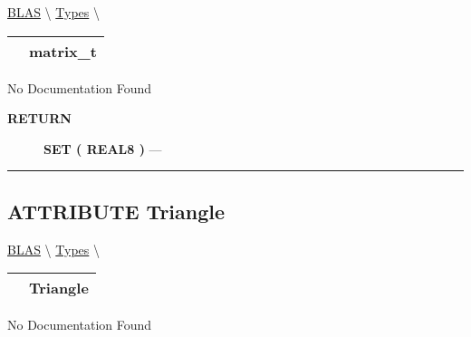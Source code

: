 \hypertarget{ecldoc:blas.types.matrix_t}{}
\hspace{0pt} \hyperlink{ecldoc:blas}{BLAS} \textbackslash 
\hspace{0pt} \hyperlink{ecldoc:BLAS.Types}{Types} \textbackslash 

{\renewcommand{\arraystretch}{1.5}
\begin{tabularx}{\textwidth}{|>{\raggedright\arraybackslash}l|X|}
\hline
\hspace{0pt}\mytexttt{\color{red} } & \textbf{matrix\_t} \\
\hline
\end{tabularx}
}

\par





No Documentation Found








\par
\begin{description}
\item [\colorbox{tagtype}{\color{white} \textbf{\textsf{RETURN}}}] \textbf{SET ( REAL8 )} --- 
\end{description}




\rule{\linewidth}{0.5pt}
\subsection*{\textsf{\colorbox{headtoc}{\color{white} ATTRIBUTE}
Triangle}}

\hypertarget{ecldoc:ecldoc-Triangle}{}
\hspace{0pt} \hyperlink{ecldoc:blas}{BLAS} \textbackslash 
\hspace{0pt} \hyperlink{ecldoc:BLAS.Types}{Types} \textbackslash 

{\renewcommand{\arraystretch}{1.5}
\begin{tabularx}{\textwidth}{|>{\raggedright\arraybackslash}l|X|}
\hline
\hspace{0pt}\mytexttt{\color{red} } & \textbf{Triangle} \\
\hline
\end{tabularx}
}

\par





No Documentation Found








